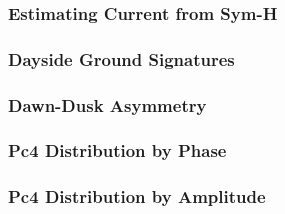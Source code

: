 \documentclass{beamer}
\newcommand{\backupend}{
   \setcounter{framenumber}{\value{finalframe}}
}
\begin{document}
\begin{frame}
\frametitle{Estimating Current from Sym-H}

\end{frame}


\begin{frame}
\frametitle{Dayside Ground Signatures}

\end{frame}


\begin{frame}
\frametitle{Dawn-Dusk Asymmetry}

\end{frame}


\begin{frame}
\frametitle{Pc4 Distribution by Phase}

\end{frame}


\begin{frame}
\frametitle{Pc4 Distribution by Amplitude}

\end{frame}


\backupend
\end{document}
